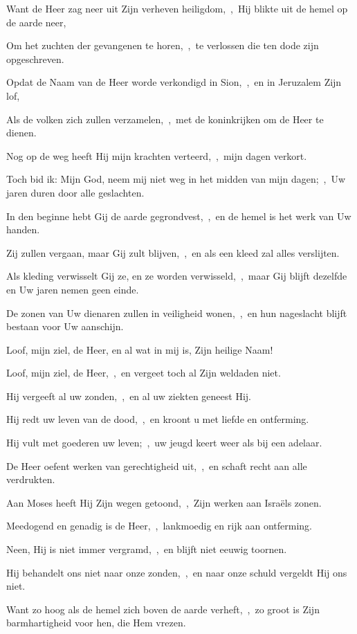 \documentclass[12pt,twoside,a5paper]{article}
\begin{document}
\begin{halfparskip}
  Want de Heer zag neer uit Zijn verheven heiligdom,~\sep\ Hij blikte uit de hemel op de aarde neer,

  Om het zuchten der gevangenen te horen,~\sep\ te verlossen die ten dode zijn opgeschreven.

  Opdat de Naam van de Heer worde verkondigd in Sion,~\sep\ en in Jeruzalem Zijn lof,

  Als de volken zich zullen verzamelen,~\sep\ met de koninkrijken om de Heer te dienen.

  Nog op de weg heeft Hij mijn krachten verteerd,~\sep\ mijn dagen verkort.

  Toch bid ik: Mijn God, neem mij niet weg in het midden van mijn dagen;~\sep\ Uw jaren duren door alle geslachten.

  In den beginne hebt Gij de aarde gegrondvest,~\sep\ en de hemel is het werk van Uw handen.

  Zij zullen vergaan, maar Gij zult blijven,~\sep\ en als een kleed zal alles verslijten.

  Als kleding verwisselt Gij ze, en ze worden verwisseld,~\sep\ maar Gij blijft dezelfde en Uw jaren nemen geen einde.

  De zonen van Uw dienaren zullen in veiligheid wonen,~\sep\ en hun nageslacht blijft bestaan voor Uw aanschijn.

   Loof, mijn ziel, de Heer, en al wat in mij is, Zijn heilige Naam!

  Loof, mijn ziel, de Heer,~\sep\ en vergeet toch al Zijn weldaden niet.

  Hij vergeeft al uw zonden,~\sep\ en al uw ziekten geneest Hij.

  Hij redt uw leven van de dood,~\sep\ en kroont u met liefde en ontferming.

  Hij vult met goederen uw leven;~\sep\ uw jeugd keert weer als bij een adelaar.

  De Heer oefent werken van gerechtigheid uit,~\sep\ en schaft recht aan alle verdrukten.

  Aan Moses heeft Hij Zijn wegen getoond,~\sep\ Zijn werken aan Israëls zonen.

  Meedogend en genadig is de Heer,~\sep\ lankmoedig en rijk aan ontferming.

  Neen, Hij is niet immer vergramd,~\sep\ en blijft niet eeuwig toornen.

  Hij behandelt ons niet naar onze zonden,~\sep\ en naar onze schuld vergeldt Hij ons niet.

  Want zo hoog als de hemel zich boven de aarde verheft,~\sep\ zo groot is Zijn barmhartigheid voor hen, die Hem vrezen.


\end{halfparskip}
\end{document}
